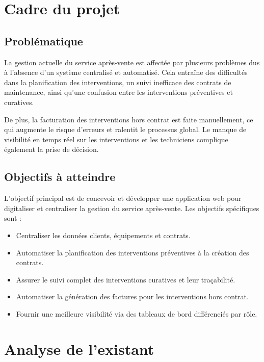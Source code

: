 \section{Cadre du projet}

\subsection{Problématique}

La gestion actuelle du service après-vente est affectée par plusieurs problèmes dus à l'absence d'un
système centralisé et automatisé. Cela entraîne des difficultés dans la planification des interventions,
un suivi inefficace des contrats de maintenance, ainsi qu'une confusion entre les interventions
préventives et curatives.

De plus, la facturation des interventions hors contrat est faite manuellement, ce qui augmente le
risque d'erreurs et ralentit le processus global. Le manque de visibilité en temps réel sur les
interventions et les techniciens complique également la prise de décision.

\subsection{Objectifs à atteindre}

L'objectif principal est de concevoir et développer une application web pour digitaliser et
centraliser la gestion du service après-vente. Les objectifs spécifiques sont :

\begin{itemize}
    \item Centraliser les données clients, équipements et contrats.
    \item Automatiser la planification des interventions préventives à la création des contrats.
    \item Assurer le suivi complet des interventions curatives et leur traçabilité.
    \item Automatiser la génération des factures pour les interventions hors contrat.
    \item Fournir une meilleure visibilité via des tableaux de bord différenciés par rôle.
\end{itemize}

\section{Analyse de l'existant}

